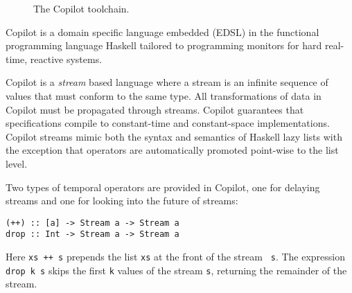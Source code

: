 \begin{figure}[ht!]
{
}
        \caption{The Copilot toolchain.}
        \label{fig:toolchain}
        \end{figure}

Copilot is a domain specific language  embedded (EDSL) in the functional
programming language Haskell   tailored to
programming monitors for hard real-time, reactive systems.

Copilot is a \emph{stream} based language where a stream is an infinite sequence of values that must conform to the same type.  All transformations of
data in Copilot must be propagated through streams. Copilot
guarantees that specifications compile to constant-time and constant-space
implementations. Copilot streams mimic both the syntax and semantics of
Haskell lazy lists with the exception that  operators are
automatically promoted point-wise to the list level.

Two types of temporal operators are provided in Copilot, one for
delaying streams and one for looking into the future of streams:
\begin{lstlisting}[frame=single]
(++) :: [a] -> Stream a -> Stream a
drop :: Int -> Stream a -> Stream a
\end{lstlisting}
%
Here {\tt xs ++ s} prepends the list {\tt xs} at the front of the stream {\tt
  s}.  The expression {\tt drop k s} skips the first {\tt k} values of the
stream {\tt s}, returning the remainder of the stream.



